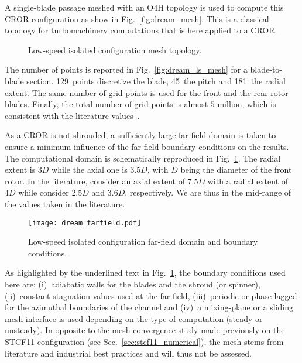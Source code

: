 
A single-blade passage meshed
with an O4H topology is used to compute this
CROR configuration as show in Fig.~\ref{fig:dream_mesh}. This is a classical
topology for turbomachinery computations that is here applied to 
a CROR.
\begin{figure}[htp]
  \centering
  \caption{Low-speed isolated configuration mesh topology.}
\end{figure}
The number of points is reported in 
Fig.~\ref{fig:dream_ls_mesh} for a blade-to-blade section. 
129~points discretize the blade, 45~the pitch and 181~the radial
extent. The same number of grid points is used for the front
and the rear rotor blades. 
Finally, the total number of grid points is almost $5$ million, which
is consistent with the literature values~\cite{Stuermer2008,Bechet2011,
Francois2013,Zachariadis2011,Peters2012}.

As a CROR is not shrouded, a sufficiently large
far-field domain is taken to ensure a minimum influence
of the far-field boundary conditions on the results.
The computational domain is schematically reproduced 
in Fig.~\ref{fig:dream_farfield}.
The radial extent is $3D$ while the axial one is $3.5D$, with
$D$ being the diameter of the front rotor.
In the literature, 
\citet{Peters2012} consider an axial extent of $7.5D$
with a radial extent of $4D$ while \citet{Zachariadis2011}
consider $2.5D$ and $3.6D$, respectively. We are thus in 
the mid-range of the values taken in the literature.
\begin{figure}[htp]
  \centering
  \texttt{[image: dream\_farfield.pdf]}
  \caption{Low-speed isolated configuration far-field domain and boundary conditions.}
  \label{fig:dream_farfield}
\end{figure}
As highlighted by the underlined text in Fig.~\ref{fig:dream_farfield},
the boundary conditions used here are: (i)~adiabatic walls
for the blades and the shroud (or spinner), (ii)~constant
stagnation values used at the far-field, (iii)~periodic
or phase-lagged for the azimuthal boundaries of the channel
and (iv)~a mixing-plane or a sliding mesh interface is
used depending on the type of computation (steady or unsteady).
In opposite to the mesh convergence study made previously on the STCF11
configuration (see Sec.~\ref{sec:stcf11_numerical}),
the mesh stems from literature and industrial best
practices and will thus not be assessed.

